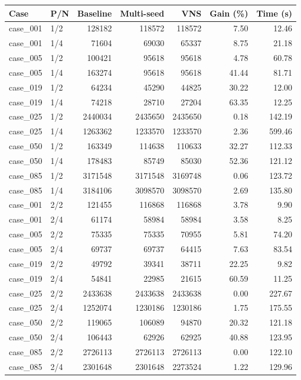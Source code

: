 \begin{tabular}{llrrrrr}
\toprule
Case & P/N & Baseline & Multi-seed & VNS & Gain (\%) & Time (s) \\
\midrule
case\_001 & 1/2 & 128182 & 118572 & 118572 & 7.50 & 12.46 \\
case\_001 & 1/4 & 71604 & 69030 & 65337 & 8.75 & 21.18 \\
case\_005 & 1/2 & 100421 & 95618 & 95618 & 4.78 & 60.78 \\
case\_005 & 1/4 & 163274 & 95618 & 95618 & 41.44 & 81.71 \\
case\_019 & 1/2 & 64234 & 45290 & 44825 & 30.22 & 12.00 \\
case\_019 & 1/4 & 74218 & 28710 & 27204 & 63.35 & 12.25 \\
case\_025 & 1/2 & 2440034 & 2435650 & 2435650 & 0.18 & 142.19 \\
case\_025 & 1/4 & 1263362 & 1233570 & 1233570 & 2.36 & 599.46 \\
case\_050 & 1/2 & 163349 & 114638 & 110633 & 32.27 & 112.33 \\
case\_050 & 1/4 & 178483 & 85749 & 85030 & 52.36 & 121.12 \\
case\_085 & 1/2 & 3171548 & 3171548 & 3169748 & 0.06 & 123.72 \\
case\_085 & 1/4 & 3184106 & 3098570 & 3098570 & 2.69 & 135.80 \\
case\_001 & 2/2 & 121455 & 116868 & 116868 & 3.78 & 9.90 \\
case\_001 & 2/4 & 61174 & 58984 & 58984 & 3.58 & 8.25 \\
case\_005 & 2/2 & 75335 & 75335 & 70955 & 5.81 & 74.20 \\
case\_005 & 2/4 & 69737 & 69737 & 64415 & 7.63 & 83.54 \\
case\_019 & 2/2 & 49792 & 39341 & 38711 & 22.25 & 9.82 \\
case\_019 & 2/4 & 54841 & 22985 & 21615 & 60.59 & 11.25 \\
case\_025 & 2/2 & 2433638 & 2433638 & 2433638 & 0.00 & 227.67 \\
case\_025 & 2/4 & 1252074 & 1230186 & 1230186 & 1.75 & 175.55 \\
case\_050 & 2/2 & 119065 & 106089 & 94870 & 20.32 & 121.18 \\
case\_050 & 2/4 & 106443 & 62926 & 62925 & 40.88 & 123.95 \\
case\_085 & 2/2 & 2726113 & 2726113 & 2726113 & 0.00 & 122.10 \\
case\_085 & 2/4 & 2301648 & 2301648 & 2273524 & 1.22 & 129.96 \\
\bottomrule
\end{tabular}
